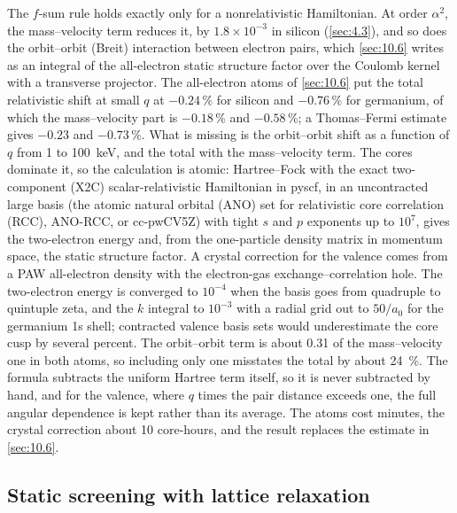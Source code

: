 The $f$-sum rule holds exactly only for a nonrelativistic Hamiltonian. At order $\alpha^2$, the mass--velocity term reduces it, by $1.8\times10^{-3}$ in silicon (\cref{sec:4.3}), and so does the orbit--orbit (Breit) interaction between electron pairs, which \cref{sec:10.6} writes as an integral of the all-electron static structure factor over the Coulomb kernel with a transverse projector. The all-electron atoms of \cref{sec:10.6} put the total relativistic shift at small $q$ at $-0.24\,\%$ for silicon and $-0.76\,\%$ for germanium, of which the mass--velocity part is $-0.18\,\%$ and $-0.58\,\%$; a Thomas--Fermi estimate gives $-0.23$ and $-0.73\,\%$. What is missing is the orbit--orbit shift as a function of $q$ from 1 to \SI{100}{keV}, and the total with the mass--velocity term. The cores dominate it, so the calculation is atomic: Hartree--Fock with the exact two-component (X2C) scalar-relativistic Hamiltonian in pyscf, in an uncontracted large basis (the atomic natural orbital (ANO) set for relativistic core correlation (RCC), ANO-RCC, or cc-pwCV5Z) with tight $s$ and $p$ exponents up to $10^7$, gives the two-electron energy and, from the one-particle density matrix in momentum space, the static structure factor. A crystal correction for the valence comes from a PAW all-electron density with the electron-gas exchange--correlation hole. The two-electron energy is converged to $10^{-4}$ when the basis goes from quadruple to quintuple zeta, and the $k$ integral to $10^{-3}$ with a radial grid out to $50/a_0$ for the germanium 1s shell; contracted valence basis sets would underestimate the core cusp by several percent. The orbit--orbit term is about 0.31 of the mass--velocity one in both atoms, so including only one misstates the total by about \SI{24}{\percent}. The formula subtracts the uniform Hartree term itself, so it is never subtracted by hand, and for the valence, where $q$ times the pair distance exceeds one, the full angular dependence is kept rather than its average. The atoms cost minutes, the crystal correction about 10 core-hours, and the result replaces the estimate in \cref{sec:10.6}.

\subsection{Static screening with lattice relaxation}

